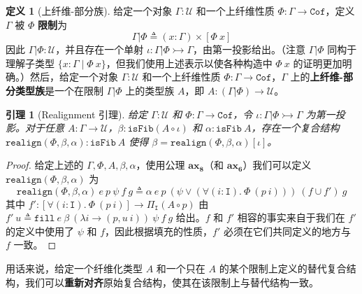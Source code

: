 \documentclass{ctexrep}
\theoremstyle{plain}
\newtheorem{lemma}[theorem]{引理}
\theoremstyle{definition}
\newtheorem{definition}[theorem]{定义}
\theoremstyle{remark}
\newcommand{\Cof}{\mathtt{Cof}}
\newcommand{\ax}[1]{\mathbf{ax_{#1}}}
\begin{document}
\begin{definition}[上纤维-部分族]
给定一个对象 $\Gamma : \mathcal{U}$ 和一个上纤维性质 $\Phi : \Gamma \to \Cof$，定义 $\Gamma$ 被 $\Phi$ \textbf{限制}为
\begin{equation}
\Gamma|\Phi \triangleq (x : \Gamma) \times [\Phi\ x]
\end{equation}
因此 $\Gamma|\Phi : \mathcal{U}$，并且存在一个单射 $\iota : \Gamma|\Phi \rightarrowtail \Gamma$，由第一投影给出。（注意 $\Gamma|\Phi$ 同构于理解子类型 $\{x : \Gamma \mid \Phi\ x\}$，但我们使用上述表示以使各种构造中 $\Phi\ x$ 的证明更加明确。）然后，给定一个对象 $\Gamma : \mathcal{U}$ 和一个上纤维性质 $\Phi : \Gamma \to \Cof$，$\Gamma$ 上的\textbf{上纤维-部分类型族}是一个在限制 $\Gamma|\Phi$ 上的类型族 $A$，即 $A : (\Gamma|\Phi) \to \mathcal{U}$。
\end{definition}

\begin{lemma}[Realignment 引理]
给定 $\Gamma : \mathcal{U}$ 和 $\Phi : \Gamma \to \Cof$，令 $\iota : \Gamma|\Phi \rightarrowtail \Gamma$ 为第一投影。对于任意 $A : \Gamma \to \mathcal{U}$，$\beta : \mathtt{isFib}(A \circ \iota)$ 和 $\alpha : \mathtt{isFib}\ A$，存在一个复合结构 $\mathtt{realign}(\Phi, \beta, \alpha) : \mathtt{isFib}\ A$ 使得 $\beta = \mathtt{realign}(\Phi, \beta, \alpha)[\iota]$。
\end{lemma}

\begin{proof}
给定上述的 $\Gamma, \Phi, A, \beta, \alpha$，使用公理 $\ax{8}$（和 $\ax{6}$）我们可以定义 $\mathtt{realign}(\Phi, \beta, \alpha)$ 为
\begin{equation}
\mathtt{realign}(\Phi, \beta, \alpha)\ e\ p\ \psi\ f\ g \triangleq \alpha\ e\ p\ (\psi \lor (\forall(i : \mathtt{I}).\ \Phi\ (p\ i)))\ (f \cup f')\ g
\end{equation}
其中 $f' : [\forall(i : \mathtt{I}).\ \Phi\ (p\ i)] \to \Pi_{\mathtt{I}}(A \circ p)$ 由 $f'\ u \triangleq \mathtt{fill}\ e\ \beta\ (\lambda i \to (p, u\ i))\ \psi\ f\ g$ 给出。$f$ 和 $f'$ 相容的事实来自于我们在 $f'$ 的定义中使用了 $\psi$ 和 $f$，因此根据填充的性质，$f'$ 必须在它们共同定义的地方与 $f$ 一致。
\end{proof}

用话来说，给定一个纤维化类型 $A$ 和一个只在 $A$ 的某个限制上定义的替代复合结构，我们可以\textbf{重新对齐}原始复合结构，使其在该限制上与替代结构一致。
\end{document}
